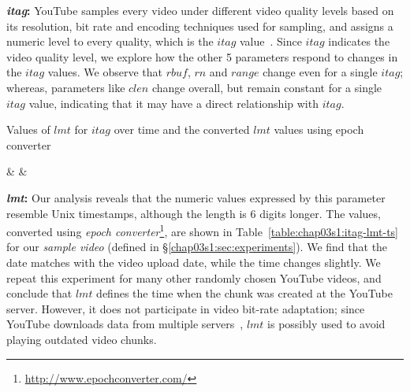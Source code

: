 {\bf {\em itag}:} YouTube samples every video under different video quality levels based on its resolution, bit rate and encoding techniques used for sampling, and assigns a numeric level to every quality, which is the $itag$ value~\cite{itag}.
Since $itag$ indicates the video quality level, we explore how the other 5 parameters respond to changes in the $itag$ values.
We observe that $rbuf$, $rn$ and $range$ change even for a single $itag$; whereas, parameters like $clen$ change overall, but remain constant for a single $itag$ value, indicating that it may have a direct relationship with $itag$. 

\begin{table}[!t]
 \small
\caption{\small{Values of $lmt$ for $itag$ over time and the converted $lmt$ values using epoch converter}}
\label{table:chap03s1:itag-lmt-ts}
 \centering
{\csvcoli & \csvcolii & \csvcoliii}%
\end{table}


{\bf {\em lmt}:} Our analysis reveals that the numeric values expressed by this parameter resemble Unix timestamps, although the length is $6$ digits longer.
The values, converted using {\em epoch converter}\footnote{\url{http://www.epochconverter.com/}}, are shown in Table~\ref{table:chap03s1:itag-lmt-ts} for our {\it sample video} (defined in \S\ref{chap03s1:sec:experiments}).
We find that the date matches with the video upload date, while the time changes slightly.
We repeat this experiment for many other randomly chosen YouTube videos, and conclude that $lmt$ defines the time when the chunk was created at the YouTube server.
However, it does not participate in video bit-rate adaptation; since YouTube downloads data from multiple servers~\cite{krishnappa2013dashing}, $lmt$ is possibly used to avoid playing outdated video chunks.

